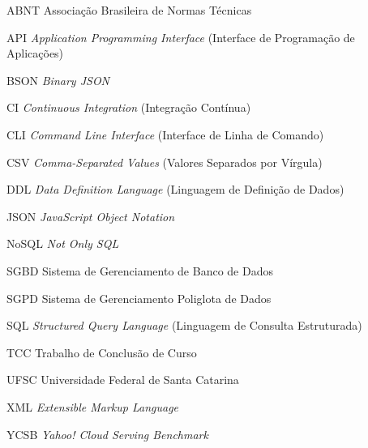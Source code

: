 \documentclass[
  12pt,
  oneside,
  a4paper,
  chapter=TITLE,
  section=TITLE,
  english,
  brazil,
]{abntex2}
\begin{document}
\begin{siglas}
  \item[ABNT] Associação Brasileira de Normas Técnicas
  \item[API] \textit{Application Programming Interface} (Interface de Programação de Aplicações)
  \item[BSON] \textit{Binary JSON}
  \item[CI] \textit{Continuous Integration} (Integração Contínua)
  \item[CLI] \textit{Command Line Interface} (Interface de Linha de Comando)
  \item[CSV] \textit{Comma-Separated Values} (Valores Separados por Vírgula)
  \item[DDL] \textit{Data Definition Language} (Linguagem de Definição de Dados)
  \item[JSON] \textit{JavaScript Object Notation}
  \item[NoSQL] \textit{Not Only SQL}
  \item[SGBD] Sistema de Gerenciamento de Banco de Dados
  \item[SGPD] Sistema de Gerenciamento Poliglota de Dados
  \item[SQL] \textit{Structured Query Language} (Linguagem de Consulta Estruturada)
  \item[TCC] Trabalho de Conclusão de Curso
  \item[UFSC] Universidade Federal de Santa Catarina
  \item[XML] \textit{Extensible Markup Language}
  \item[YCSB] \textit{Yahoo! Cloud Serving Benchmark}
\end{siglas}

\tableofcontents*
\cleardoublepage

\textual









\postextual

\renewcommand{\bibname}{Referências}


\begin{apendicesenv}
\partapendices



\end{apendicesenv}

\printindex
\end{document}
